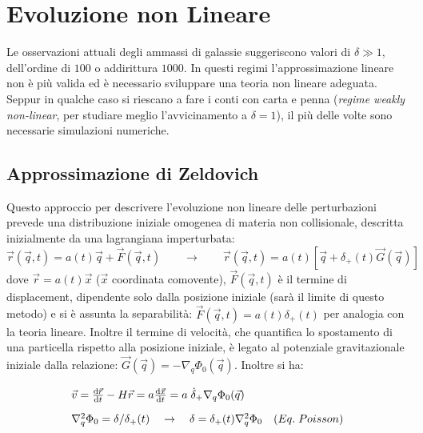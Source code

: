 \chapter{Evoluzione non Lineare}\label{9:ch}
Le osservazioni attuali degli ammassi di galassie suggeriscono valori di $\delta \gg 1$, dell'ordine di $100$ o addirittura $1000$. In questi regimi l'approssimazione lineare non è più valida ed è necessario sviluppare una teoria non lineare adeguata. Seppur in qualche caso si riescano a fare i conti con carta e penna (\textit{regime weakly non-linear}, per studiare meglio l'avvicinamento a $\delta = 1$), il più delle volte sono necessarie simulazioni numeriche. 


\section{Approssimazione di Zeldovich}
Questo approccio per descrivere l'evoluzione non lineare delle perturbazioni prevede una distribuzione iniziale omogenea di materia non collisionale, descritta inizialmente da una lagrangiana imperturbata:
\begin{equation}
    \vec{r}(\vec{q},t)=a(t)\vec{q}+\vec{F}(\vec{q},t) \qquad \rightarrow \qquad \vec{r}(\vec{q},t)=a(t)\left[\vec{q}+\delta_+ (t) \vec{G}(\vec{q})\right]\label{eq9:zelapprox}
\end{equation}
dove $\vec{r}=a(t)\vec{x}$ ($\vec{x}$ coordinata comovente), $\vec{F}(\vec{q},t)$ è il termine di displacement, dipendente solo dalla posizione iniziale (sarà il limite di questo metodo) e si è assunta la separabilità: $\vec{F}(\vec{q},t)=a(t)\delta_+ (t)$ per analogia con la teoria lineare. Inoltre il termine di velocità, che quantifica lo spostamento di una particella rispetto alla posizione iniziale, è legato al potenziale gravitazionale iniziale dalla relazione: $\vec{G}(\vec{q})= -\nabla_q \Phi_0 (\vec{q})$. Inoltre si ha:
\begin{equation*}\left.
    \def\arraystretch{1.8}
        \begin{array}{l}
        \vec{v}=\frac{\d{\vec{r}}}{\d{t}}-H\vec{r}=a\frac{\d{\vec{x}}}{\d{t}}=a\;\dot{\delta}_+\nabla_q \Phi_0 (\vec{q}) \\
        \nabla^2_q \Phi_0 = \delta / \delta_+ (t) \quad\rightarrow\quad \delta = \delta_+ (t)\nabla^2_q \Phi_0  \quad (Eq.\; Poisson)
        
    \end{array}\right. 
\end{equation*}

